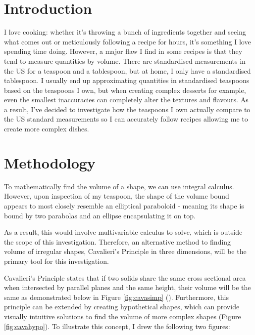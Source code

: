 \documentclass[12pt]{article}
\begin{document}
\section{Introduction}

I love cooking: whether it's throwing a bunch of ingredients together and seeing what comes out or meticulously following a recipe for hours, it's something I love spending time doing. However, a major flaw I find in some recipes is that they tend to measure quantities by volume. There are standardised measurements in the US for a teaspoon and a tablespoon, but at home, I only have a standardised tablespoon. I usually end up approximating quantities in standardised teaspoons based on the teaspoons I own, but when creating complex desserts for example, even the smallest inaccuracies  can completely alter the textures and flavours. As a result, I've decided to investigate how the teaspoons I own actually compare to the US standard measurements so I can accurately follow recipes allowing me to create more complex dishes.

\section{Methodology}\label{method}

To mathematically find the volume of a shape, we can use integral calculus. However, upon inspection of my teaspoon, the shape of the volume bound appears to most closely resemble an elliptical paraboloid - meaning its shape is bound by two parabolas and an ellipse encapsulating it on top. 

As a result, this would involve multivariable calculus to solve, which is outside the scope of this investigation. Therefore, an alternative method to finding volume of irregular shapes, Cavalieri's Principle in three dimensions, will be the primary tool for this investigation. 

Cavalieri's Principle states that if two solids share the same cross sectional area when intersected by parallel planes and the same height, their volume will be the same as demonstrated below in Figure \ref{fig:cavasimp} (\citeauthor{cavalieri_1653}). Furthermore, this principle can be extended by creating hypothetical shapes, which can provide visually intuitive solutions to find the volume of more complex shapes (Figure \ref{fig:cavahypo}). To illustrate this concept, I drew  the following two figures: \\
\end{document}
